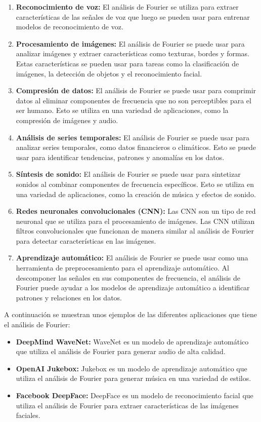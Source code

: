\begin{enumerate} \def\labelenumi{\alph{enumi}.}
	\item   \textbf{Reconocimiento de voz:} El análisis de Fourier se utiliza para   extraer características de las señales de voz que luego se pueden usar   para entrenar modelos de reconocimiento de voz.
	\item   \textbf{Procesamiento de imágenes:} El análisis de Fourier se puede   usar para analizar imágenes y extraer características como texturas,   bordes y formas. Estas características se pueden usar para tareas como   la clasificación de imágenes, la detección de objetos y el   reconocimiento facial.
	\item \textbf{Compresión de datos:} El análisis de Fourier se puede usar   para comprimir datos al eliminar componentes de frecuencia que no son   perceptibles para el ser humano. Esto se utiliza en una variedad de   aplicaciones, como la compresión de imágenes y audio.
	\item \textbf{Análisis de series temporales:} El análisis de Fourier se   puede usar para analizar series temporales, como datos financieros o   climáticos. Esto se puede usar para identificar tendencias, patrones y   anomalías en los datos.
	\item \textbf{Síntesis de sonido:} El análisis de Fourier se puede usar para   sintetizar sonidos al combinar componentes de frecuencia específicos.   Esto se utiliza en una variedad de aplicaciones, como la creación de   música y efectos de sonido.
	\item \textbf{Redes neuronales convolucionales (CNN):} Las CNN son un tipo de red neuronal que se utiliza para el procesamiento de imágenes. Las CNN utilizan filtros convolucionales que funcionan de manera similar   al análisis de Fourier para detectar características en las imágenes.
	\item \textbf{Aprendizaje automático:} El análisis de Fourier se puede usar   como una herramienta de preprocesamiento para el aprendizaje   automático. Al descomponer las señales en sus componentes de   frecuencia, el análisis de Fourier puede ayudar a los modelos de   aprendizaje automático a identificar patrones y relaciones en los datos.
\end{enumerate}

A continuación se muestran unos ejemplos de las diferentes aplicaciones que tiene el análisis de Fourier:

\begin{itemize}
	\item \textbf{DeepMind WaveNet:} WaveNet es un modelo de aprendizaje automático que utiliza el análisis de Fourier para generar audio de   alta calidad.
	\item \textbf{OpenAI Jukebox:} Jukebox es un modelo de aprendizaje automático que utiliza el análisis de Fourier para generar música en   una variedad de estilos.
	\item \textbf{Facebook DeepFace:} DeepFace es un modelo de reconocimiento   facial que utiliza el análisis de Fourier para extraer características   de las imágenes faciales. \end{itemize}

